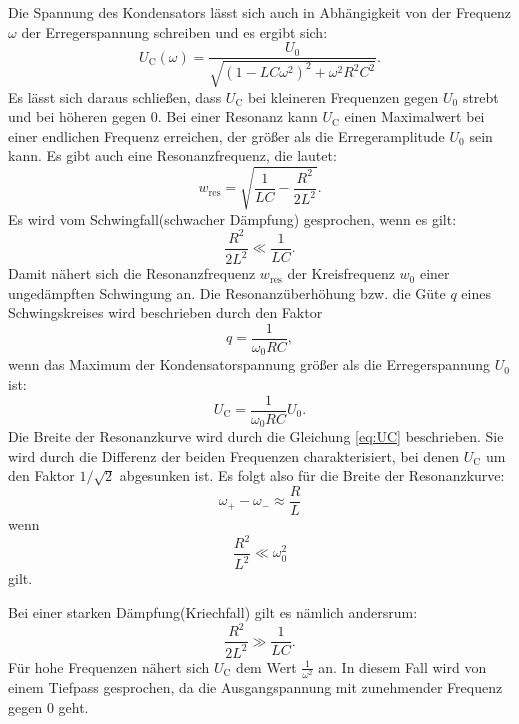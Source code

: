 Die Spannung des Kondensators lässt sich auch in Abhängigkeit von der Frequenz $\omega$ der Erregerspannung schreiben und es ergibt sich:
\begin{equation}
\label{eq:UC}
U_\text{C}(\omega) = \frac{U_{0}}{\sqrt{(1-LC\omega^{2})^{2}+\omega^{2}R^{2}C^{2}}}.
\end{equation}
Es lässt sich daraus schließen, dass $U_\text{C}$ bei kleineren Frequenzen gegen $U_{0}$ strebt und bei höheren gegen 0. Bei einer Resonanz kann $U_\text{C}$ einen 
Maximalwert bei einer endlichen Frequenz erreichen, der größer als die Erregeramplitude $U_{0}$ sein kann. Es gibt auch eine Resonanzfrequenz, die lautet:
\begin{equation*}
w_{\text{res}} = \sqrt{\frac{1}{LC}-\frac{R^{2}}{2L^{2}}}.
\end{equation*}
Es wird vom Schwingfall(schwacher Dämpfung) gesprochen, wenn es gilt:
\begin{equation}
\frac{R^{2}}{2L^{2}} \ll \frac{1}{LC}.
\label{eq:resonanzfrequenz}
\end{equation}
Damit nähert sich die Resonanzfrequenz $w_{\text{res}}$ der Kreisfrequenz $w_{0}$ einer ungedämpften Schwingung an. Die Resonanzüberhöhung bzw. die Güte $q$ eines Schwingskreises wird beschrieben durch den 
Faktor 
\begin{equation}
q = \frac{1}{\omega_{0}RC},
\label{eqn:guete}
\end{equation}
wenn das Maximum der Kondensatorspannung größer als die Erregerspannung $U_{0}$ ist:
\begin{equation*}
U_\text{C} = \frac{1}{\omega_{0}RC}U_{0}.
\end{equation*}
Die Breite der Resonanzkurve wird durch die Gleichung \ref{eq:UC} beschrieben. Sie wird durch die Differenz der beiden Frequenzen charakterisiert, bei denen $U_{\text{C}}$ um den Faktor $1/\sqrt{2}$ abgesunken ist. 
Es folgt also für die Breite der Resonanzkurve:
\begin{equation}
\omega_{+} - \omega_{-} \approx \frac{R}{L}
\label{eq:kurvebreite}
\end{equation}
wenn
\begin{equation*}
\frac{R^{2}}{L^{2}} \ll \omega_{0}^{2}
\end{equation*}
gilt.

Bei einer starken Dämpfung(Kriechfall) gilt es nämlich andersrum:
\begin{equation*}
\frac{R^{2}}{2L^{2}} \gg \frac{1}{LC}.
\end{equation*}
Für hohe Frequenzen nähert sich $U_\text{C}$ dem Wert $\frac{1}{\omega^{2}}$ an. In diesem Fall wird von einem Tiefpass gesprochen, da die Ausgangspannung mit zunehmender Frequenz gegen 0 geht.
